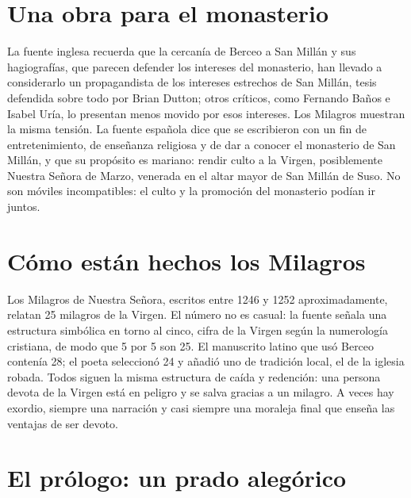 \documentclass{book}
\begin{document}

\section{Una obra para el monasterio}

La fuente inglesa recuerda que la cercanía de Berceo a San Millán y sus hagiografías, que parecen defender los intereses del monasterio, han llevado a considerarlo un propagandista de los intereses estrechos de San Millán, tesis defendida sobre todo por Brian Dutton; otros críticos, como Fernando Baños e Isabel Uría, lo presentan menos movido por esos intereses. Los Milagros muestran la misma tensión. La fuente española dice que se escribieron con un fin de entretenimiento, de enseñanza religiosa y de dar a conocer el monasterio de San Millán, y que su propósito es mariano: rendir culto a la Virgen, posiblemente Nuestra Señora de Marzo, venerada en el altar mayor de San Millán de Suso. No son móviles incompatibles: el culto y la promoción del monasterio podían ir juntos.


\section{Cómo están hechos los Milagros}

Los Milagros de Nuestra Señora, escritos entre 1246 y 1252 aproximadamente, relatan 25 milagros de la Virgen. El número no es casual: la fuente señala una estructura simbólica en torno al cinco, cifra de la Virgen según la numerología cristiana, de modo que 5 por 5 son 25. El manuscrito latino que usó Berceo contenía 28; el poeta seleccionó 24 y añadió uno de tradición local, el de la iglesia robada. Todos siguen la misma estructura de caída y redención: una persona devota de la Virgen está en peligro y se salva gracias a un milagro. A veces hay exordio, siempre una narración y casi siempre una moraleja final que enseña las ventajas de ser devoto.


\section{El prólogo: un prado alegórico}
\end{document}
